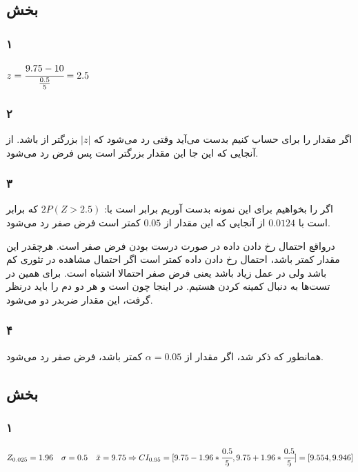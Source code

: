 \documentclass[12pt]{article}
\begin{document}
	\subsection{بخش }
	\subsubsection{۱}
	\begin{latin}
		$
		z = \cfrac{9.75 - 10}{\frac{0.5}{5}} = 2.5
		$
	\end{latin}
	\subsubsection{۲}
	اگر مقدار 
	را برای 
	حساب کنیم بدست می‌آید 
	وقتی رد می‌شود که 
	$|z|$
	بزرگتر از 
	باشد. از آنجایی که این جا این مقدار بزرگتر است پس فرض 
	رد می‌شود. 
	
	\subsubsection{۳}
	اگر 
	را بخواهیم برای این نمونه بدست آوریم برابر است با:
	$2P(Z > 2.5)$
	که برابر است با
	$0.0124$
	از آنجایی که این مقدار از 
	$0.05$
	کمتر است فرض صفر رد می‌شود.
	
	درواقع احتمال رخ دادن داده در صورت درست بودن فرض صفر است. هرچقدر این مقدار کمتر باشد، احتمال رخ دادن داده کمتر است اگر احتمال مشاهده در تئوری کم باشد ولی در عمل زیاد باشد یعنی فرض صفر احتمالا اشتباه است. برای همین در تست‌ها به دنبال کمینه کردن  هستیم. در اینجا چون
	است و هر دو دم را باید درنظر گرفت، این مقدار ضربدر دو می‌شود.
	
	\subsubsection{۴}
	همانطور که ذکر شد، اگر مقدار 
	از 
	$\alpha = 0.05$
	کمتر باشد، فرض صفر رد می‌شود.
	\subsection{بخش }
	\subsubsection{۱}
	\begin{latin}
		$
		Z_{0.025} = 1.96 \quad \sigma = 0.5 \quad \bar{x} = 9.75
		\Rightarrow
		CI_{0.95} = [9.75 - 1.96 * \cfrac{0.5}{5}, 9.75 + 1.96 * \cfrac{0.5}{5}]
		= [9.554, 9.946]
		$
	\end{latin}
\end{document}
